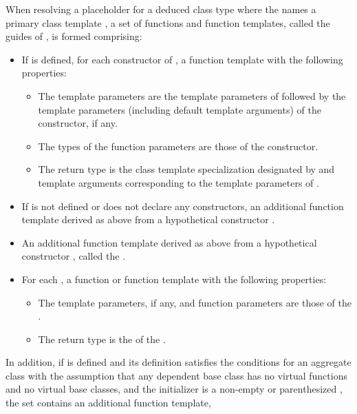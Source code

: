 \pnum
When resolving a placeholder for a deduced class type
where the  names a primary class template ,
a set of functions and function templates, called the guides of ,
is formed comprising:
\begin{itemize}
\item
If  is defined,
for each constructor of ,
a function template with the following properties:
\begin{itemize}
\item
The template parameters are the template parameters of 
followed
by the template parameters (including default template arguments) of the constructor,
if any.
\item
The types of the function parameters are those of the constructor.
\item
The return type is the class template specialization
designated by 
and template arguments
corresponding to the template parameters of .
\end{itemize}

\item
If 
is not defined or does not declare any constructors,
an additional function template derived as above
from a hypothetical constructor .

\item
An additional function template derived as above
from a hypothetical constructor ,
called the .

\item
For each ,
a function or function template
with the following properties:

\begin{itemize}
\item
The template parameters, if any,
and function parameters
are those of the .
\item
The return type
is the 
of the .
\end{itemize}
\end{itemize}
In addition, if  is defined
and its definition satisfies the conditions for an aggregate class
with the assumption that any dependent base class has
no virtual functions and no virtual base classes, and
the initializer is a non-empty  or
parenthesized ,
the set contains an additional function template,
